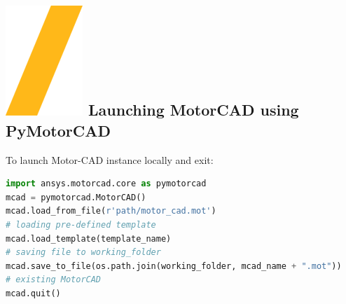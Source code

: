 \documentclass[landscape]{article}
\begin{document}
\begin{multicols}{3}
\setlength{\premulticols}{1pt}
\setlength{\postmulticols}{1pt}
\setlength{\multicolsep}{1pt}
\setlength{\columnsep}{2pt}

\section{\includegraphics[height=\fontcharht\font`\S]{slash.png} Launching MotorCAD using PyMotorCAD}
\justifying
To launch Motor-CAD instance locally and exit:
\begin{lstlisting}[language=Python]
import ansys.motorcad.core as pymotorcad
mcad = pymotorcad.MotorCAD()
mcad.load_from_file(r'path/motor_cad.mot')
# loading pre-defined template
mcad.load_template(template_name)
# saving file to working_folder
mcad.save_to_file(os.path.join(working_folder, mcad_name + ".mot"))
# existing MotorCAD
mcad.quit()
\end{lstlisting}



\end{multicols}
\end{document}
